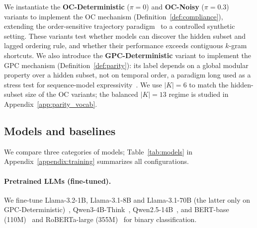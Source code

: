 \documentclass{article} %
\theoremstyle{plain}
\theoremstyle{definition}
\theoremstyle{remark}
\begin{document}
We instantiate the \textbf{OC-Deterministic} ($\pi=0$) and \textbf{OC-Noisy} ($\pi=0.3$) variants to implement the OC mechanism (Definition~\ref{def:compliance}), extending the order-sensitive trajectory paradigm~\citep{edelman2026order_specific_ehr,placido2023pancreatic_trajectories} to a controlled synthetic setting. These variants test whether models can discover the hidden subset and lagged ordering rule, and whether their performance exceeds contiguous $k$-gram shortcuts. We also introduce the \textbf{GPC-Deterministic} variant to implement the GPC mechanism (Definition~\ref{def:parity}): its label depends on a global modular property over a hidden subset, not on temporal order, a paradigm long used as a stress test for sequence-model expressivity~\citep{hahn-2020-theoretical}. We use $|K|=6$ to match the hidden-subset size of the OC variants; the balanced $|K|=13$ regime is studied in Appendix~\ref{app:parity_vocab}.

\begin{table}[tb]
\centering
\caption{Dataset characteristics for the sequential classification task. $N_{train}$ indicates training size.}
\label{tab:datasets}
\end{table}

\subsection{Models and baselines}
\label{subsec:models}

We compare three categories of models; Table~\ref{tab:models} in Appendix~\ref{appendix:training} summarizes all configurations.

\paragraph{Pretrained LLMs (fine-tuned).} We fine-tune Llama-3.2-1B, Llama-3.1-8B and Llama-3.1-70B (the latter only on GPC-Deterministic)~\citep{touvron2023llama, grattafiori2024llama3}, Qwen3-4B-Think~\citep{bai2023qwen}, Qwen2.5-14B~\citep{qwen2.5, qwen2}, and BERT-base (110M)~\citep{devlin2019bert} and RoBERTa-large (355M)~\citep{liu2019robertarobustlyoptimizedbert} for binary classification.
\end{document}
